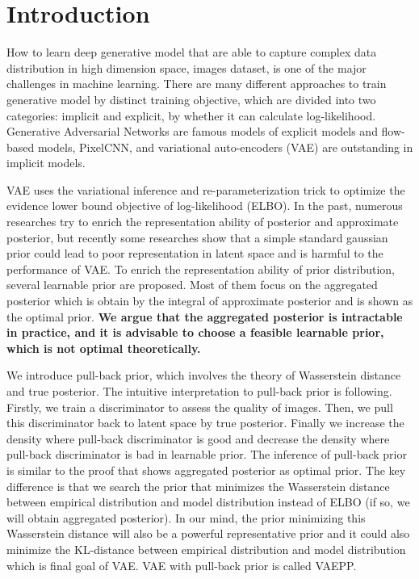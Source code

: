 \section{Introduction}

How to learn deep generative model that are able to capture complex data distribution in high dimension space, \IE images dataset, is one of the major challenges in machine learning. There are many different approaches to train generative model by distinct training objective, which are divided into two categories: implicit and explicit, by whether it can calculate log-likelihood. Generative Adversarial Networks are famous models of explicit models and flow-based models, PixelCNN, and variational auto-encoders (VAE) are outstanding in implicit models. 

VAE uses the variational inference and re-parameterization trick to optimize the evidence lower bound objective of log-likelihood (ELBO). In the past, numerous researches try to enrich the representation ability of posterior and approximate posterior, but recently some researches show that a simple standard gaussian prior could lead to poor representation in latent space and is harmful to the performance of VAE. To enrich the representation ability of prior distribution, several learnable prior are proposed. Most of them focus on the aggregated posterior which is obtain by the integral of approximate posterior and is shown as the optimal prior. \textbf{We argue that the aggregated posterior is intractable in practice, and it is advisable to choose a feasible learnable prior, which is not optimal theoretically. } 

We introduce pull-back prior, which involves the theory of Wasserstein distance and true posterior. The intuitive interpretation to pull-back prior is following. Firstly, we train a discriminator to assess the quality of images. Then, we pull this discriminator back to latent space by true posterior. Finally we increase the density where pull-back discriminator is good and decrease the density where pull-back discriminator is bad in learnable prior. The inference of pull-back prior is similar to the proof that shows aggregated posterior as optimal prior. The key difference is that we search the prior that minimizes the Wasserstein distance between empirical distribution and model distribution instead of ELBO (if so, we will obtain aggregated posterior). In our mind, the prior minimizing this Wasserstein distance will also be a powerful representative prior and it could also minimize the KL-distance between empirical distribution and model distribution which is final goal of VAE. VAE with pull-back prior is called VAEPP. 

